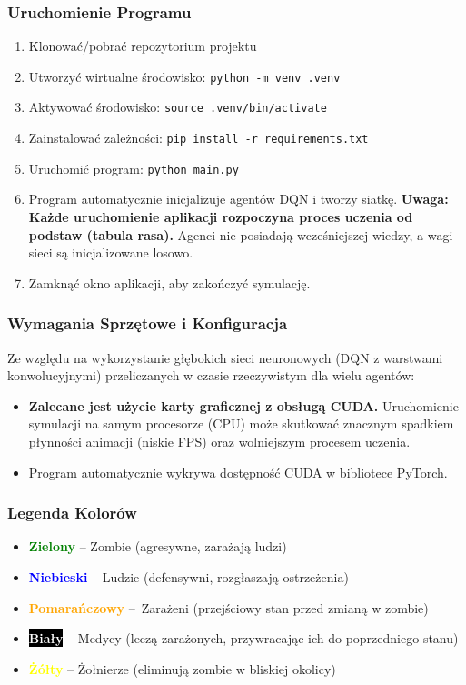 \documentclass[12pt,a4paper]{article}
\begin{document}
\subsubsection{Uruchomienie Programu}
\begin{enumerate}
	\item Klonować/pobrać repozytorium projektu
	\item Utworzyć wirtualne środowisko: \texttt{python -m venv .venv}
	\item Aktywować środowisko: \texttt{source .venv/bin/activate}
	\item Zainstalować zależności: \texttt{pip install -r requirements.txt}
	\item Uruchomić program: \texttt{python main.py}
	\item Program automatycznie inicjalizuje agentów DQN i tworzy siatkę. \textbf{Uwaga:
		      Każde uruchomienie aplikacji rozpoczyna proces uczenia od podstaw (tabula
		      rasa).} Agenci nie posiadają wcześniejszej wiedzy, a wagi sieci są
	      inicjalizowane losowo.
	\item Zamknąć okno aplikacji, aby zakończyć symulację.
\end{enumerate}

\subsubsection{Wymagania Sprzętowe i Konfiguracja}
Ze względu na wykorzystanie głębokich sieci neuronowych (DQN z warstwami
konwolucyjnymi) przeliczanych w czasie rzeczywistym dla wielu agentów:
\begin{itemize}
	\item \textbf{Zalecane jest użycie karty graficznej z obsługą CUDA.} Uruchomienie symulacji na samym procesorze (CPU) może skutkować znacznym spadkiem płynności animacji (niskie FPS) oraz wolniejszym procesem uczenia.
	\item Program automatycznie wykrywa dostępność CUDA w bibliotece PyTorch.
\end{itemize}

\subsubsection{Legenda Kolorów}
\begin{itemize}
	\item \textbf{\textcolor{green}{Zielony}} -- Zombie (agresywne, zarażają ludzi)
	\item \textbf{\textcolor{blue}{Niebieski}} -- Ludzie (defensywni, rozgłaszają ostrzeżenia)
	\item \textbf{\textcolor{orange}{Pomarańczowy}} --~Zarażeni (przejściowy stan przed zmianą w zombie)
	\item \textbf{\colorbox{black}{\textcolor{white}{Biały}}} -- Medycy (leczą zarażonych, przywracając ich do poprzedniego stanu)
	\item \textbf{\textcolor{yellow}{Żółty}} -- Żołnierze (eliminują zombie w bliskiej okolicy)
\end{itemize}
\end{document}
